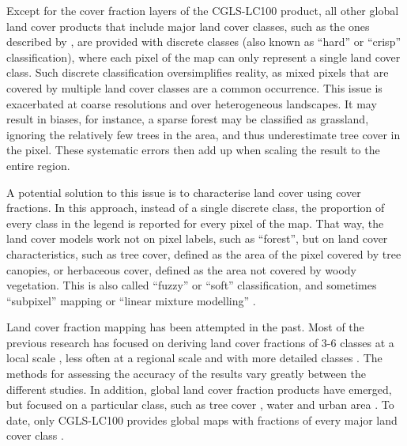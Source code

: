 \documentclass[review,authoryear,3p]{elsarticle}
\begin{document}
Except for the cover fraction layers of the \ac{CGLS-LC100} product, all other global land cover products that include major land cover classes, such as the ones described by \citet{bartholome2005glc2000, friedl2010modis, arino2007globcover, see2015hybrid, chen2015globeland30}, are provided with discrete classes (also known as ``hard'' or ``crisp'' classification), where each pixel of the map can only represent a single land cover class.
Such discrete classification oversimplifies reality, as mixed pixels that are covered by multiple land cover classes are a common occurrence. 
This issue is exacerbated at coarse resolutions and over heterogeneous landscapes.
It may result in biases, for instance, a sparse forest may be classified as grassland, ignoring the relatively few trees in the area, and thus underestimate tree cover in the pixel.
These systematic errors then add up when scaling the result to the entire region.

A potential solution to this issue is to characterise land cover using cover fractions.
In this approach, instead of a single discrete class, the proportion of every class in the legend is reported for every pixel of the map.
That way, the land cover models work not on pixel labels, such as ``forest'', but on land cover characteristics, such as tree cover, defined as the area of the pixel covered by tree canopies, or herbaceous cover, defined as the area not covered by woody vegetation.
This is also called ``fuzzy'' or ``soft'' classification, and sometimes ``subpixel'' mapping or ``linear mixture modelling'' \citep{Okeke2006fuzzyexponent}.

Land cover fraction mapping has been attempted in the past.
Most of the previous research has focused on deriving land cover fractions of 3-6 classes at a local scale  \citep{adams_classification_1995, foody1996fuzzyevaluation, walton2008subpixelrf, hansen_continuous_2011, sharma_assessing_2011, uma_shankar_wavelet-fuzzy_2011, dwivedi_optimisation_2012, lizarazo_quantitative_2012, gessner_estimating_2013, okujeni_generalizing_2018}, less often at a regional scale and with more detailed classes \citep{colditz_land_2011}.
The methods for assessing the accuracy of the results vary greatly between the different studies.
In addition, global land cover fraction products have emerged, but focused on a particular class, such as tree cover \citep{hansen_global_2003, Hansen2013forestchange, townshend_global_2017}, water \citep{schroeder_development_2015, pekel_high-resolution_2016} and urban area \citep{corbane_automated_2019, gao_mapping_2020, gong_annual_2020}.
To date, only \ac{CGLS-LC100} \citep{marcel_buchhorn_copernicus_2019} provides global maps with fractions of every major land cover class \citep{nandin-erdene_tsendbazar_copernicus_2019}.
\end{document}
